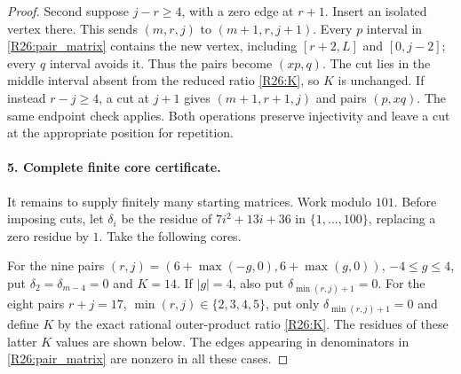 \begin{proof}
Second suppose $j-r\geq4$, with a zero edge at $r+1$.
Insert an isolated vertex there. This sends $(m,r,j)$ to
$(m+1,r,j+1)$. Every $p$ interval in
\eqref{R26:pair_matrix} contains the new vertex, including
$[r+2,L]$ and $[0,j-2]$; every $q$ interval avoids it.
Thus the pairs become $(xp,q)$. The cut lies in the middle
interval absent from the reduced ratio \eqref{R26:K}, so $K$
is unchanged. If instead $r-j\geq4$, a cut at $j+1$ gives
$(m+1,r+1,j)$ and pairs $(p,xq)$. The same endpoint check applies.
Both operations preserve injectivity and leave a cut at the
appropriate position for repetition.

\paragraph{5. Complete finite core certificate.}
It remains to supply finitely many starting matrices. Work
modulo $101$. Before imposing cuts, let $\delta_i$ be the
residue of $7i^2+13i+36$ in $\{1,\ldots,100\}$, replacing a
zero residue by $1$. Take the following cores.

For the nine pairs $(r,j)=(6+\max(-g,0),6+\max(g,0))$,
$-4\leq g\leq4$, put $\delta_2=\delta_{m-4}=0$ and $K=14$.
If $|g|=4$, also put $\delta_{\min(r,j)+1}=0$.
For the eight pairs $r+j=17$, $\min(r,j)\in\{2,3,4,5\}$,
put only $\delta_{\min(r,j)+1}=0$ and define $K$ by the exact
rational outer-product ratio \eqref{R26:K}. The residues of
these latter $K$ values are shown below. The edges appearing
in denominators in \eqref{R26:pair_matrix} are nonzero in all
these cases.


\end{proof}
